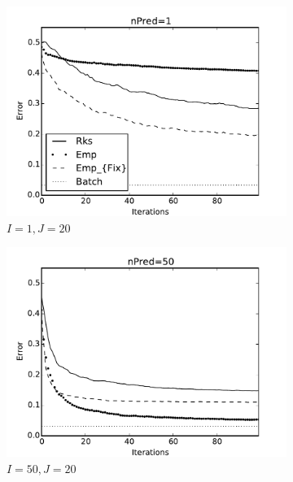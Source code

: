 \documentclass{article} %
\begin{document}
\begin{figure}[!ht]
   \centering
    \begin{subfigure}[b]{0.235\textwidth}
        \includegraphics[width=\textwidth]{imgs/rks_emp_comparison-expand-20-pred-1}
        \caption{$I=1, J=20$}
        \label{fig:expand_20_pred_1}
    \end{subfigure}
    \hfill
    \begin{subfigure}[b]{0.235\textwidth}
        \includegraphics[width=\textwidth]{imgs/rks_emp_comparison-expand-20-pred-50}
        \caption{$I=50, J=20$}
        \label{fig:expand_20_pred_50}
    \end{subfigure}\\
        \begin{subfigure}[b]{0.235\textwidth}

\end{subfigure}
\end{figure}
\end{document}
